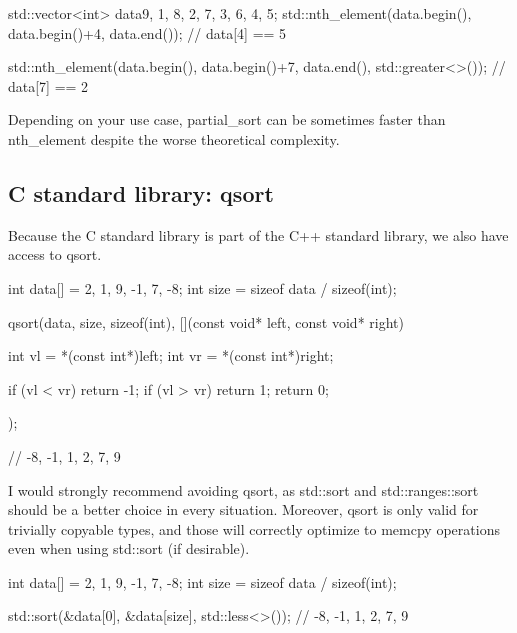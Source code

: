 \begin{box-note}
\begin{cppcode}
std::vector<int> data{9, 1, 8, 2, 7, 3, 6, 4, 5};
std::nth_element(data.begin(), data.begin()+4, data.end());
// data[4] == 5

std::nth_element(data.begin(), data.begin()+7, data.end(), std::greater<>());
// data[7] == 2
\end{cppcode}
\end{box-note}

Depending on your use case, partial\_sort can be sometimes faster than nth\_element despite the worse theoretical complexity.

\subsection{C standard library: qsort}

Because the C standard library is part of the C++ standard library, we also have access to qsort.

\begin{box-note}
\begin{cppcode}
int data[] = {2, 1, 9, -1, 7, -8};
int size = sizeof data / sizeof(int);

qsort(data, size, sizeof(int), [](const void* left, const void* right){
    int vl = *(const int*)left;
    int vr = *(const int*)right;

    if (vl < vr) return -1;
    if (vl > vr) return 1;
    return 0;
});

// -8, -1, 1, 2, 7, 9
\end{cppcode}
\end{box-note}

I would strongly recommend avoiding qsort, as std::sort and std::ranges::sort should be a better choice in every situation. Moreover, qsort is only valid for trivially copyable types, and those will correctly optimize to memcpy operations even when using std::sort (if desirable).

\begin{box-note}
\begin{cppcode}
int data[] = {2, 1, 9, -1, 7, -8};
int size = sizeof data / sizeof(int);

std::sort(&data[0], &data[size], std::less<>());
// -8, -1, 1, 2, 7, 9
\end{cppcode}
\end{box-note}